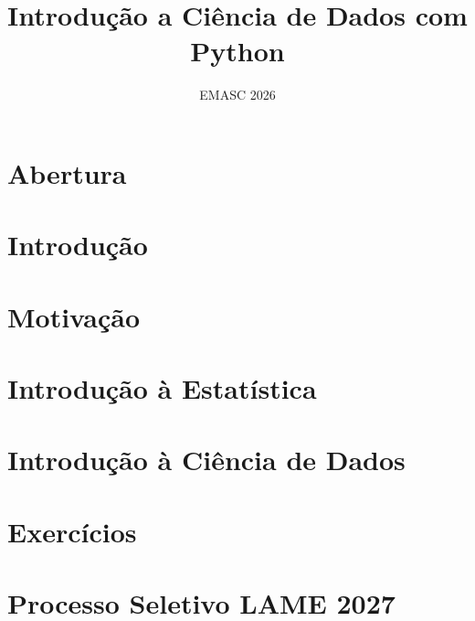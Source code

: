 \documentclass[aspectratio=169,11pt]{beamer}
\title{Introdução a Ciência de Dados com Python}
\institute{Liga Acadêmica Matemática \& Empresa}
\date{EMASC 2026}
\begin{document}
\section{Abertura}


\section{Introdução}


\section{Motivação}


\section{Introdução à Estatística}


\section{Introdução à Ciência de Dados}


\section{Exercícios}


\section{Processo Seletivo LAME 2027}

\end{document}

